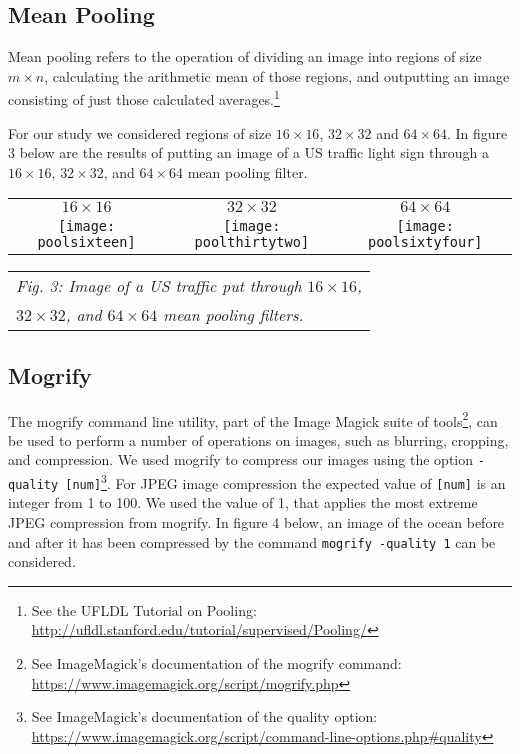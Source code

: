 \documentclass[letterpaper, 10 pt, conference]{ieeeconf}  %
\begin{document}
\subsection{Mean Pooling}
Mean pooling refers to the operation of dividing
an image into regions of size $m \times n$, calculating
the arithmetic mean of those regions, and outputting
an image consisting of just those calculated averages.\footnote{See the UFLDL Tutorial on Pooling: \url{http://ufldl.stanford.edu/tutorial/supervised/Pooling/}}

For our study we considered regions of size $16 \times 16$, $32 \times 32$ and $64 \times 64$.
In figure 3 below are the results of putting an image of a US traffic light sign through
a $16 \times 16$, $32 \times 32$, and $64 \times 64$ mean pooling filter.

\vspace*{3mm}
\begin{tabular}{c c c}
	$16 \times 16$ & $32 \times 32$ & $64 \times 64$ \\
	\texttt{[image: poolsixteen]} &
		\texttt{[image: poolthirtytwo]} &
		\texttt{[image: poolsixtyfour]} \\
\end{tabular}
\begin{tabular}{l}
    {\it \hspace*{4mm} Fig. 3: Image of a US traffic put through $16 \times 16$,} \\
    {\it \hspace*{4mm} $32 \times 32$, and $64 \times 64$ mean pooling filters.} \\
\end{tabular}

\subsection{Mogrify}
The mogrify command line utility, part of the Image Magick suite of tools\footnote{See ImageMagick's documentation of the mogrify command: \url{https://www.imagemagick.org/script/mogrify.php}}, can be used to perform a number of operations
on images, such as blurring, cropping, and compression.
We used mogrify to compress our images using the option {\tt -quality [num]}\footnote{See ImageMagick's documentation of the quality option: \url{https://www.imagemagick.org/script/command-line-options.php\#quality}}. For JPEG image compression the expected value of {\tt [num]} is an integer from 1 to 100. We used the value of 1, that applies the most extreme JPEG compression from mogrify.
In figure 4 below, an image of the ocean before and after it has been compressed by the command {\tt mogrify -quality 1} can be considered.
\end{document}

